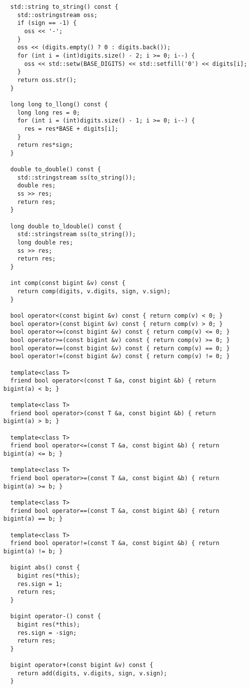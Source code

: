 \begin{lstlisting}
  std::string to_string() const {
    std::ostringstream oss;
    if (sign == -1) {
      oss << '-';
    }
    oss << (digits.empty() ? 0 : digits.back());
    for (int i = (int)digits.size() - 2; i >= 0; i--) {
      oss << std::setw(BASE_DIGITS) << std::setfill('0') << digits[i];
    }
    return oss.str();
  }

  long long to_llong() const {
    long long res = 0;
    for (int i = (int)digits.size() - 1; i >= 0; i--) {
      res = res*BASE + digits[i];
    }
    return res*sign;
  }

  double to_double() const {
    std::stringstream ss(to_string());
    double res;
    ss >> res;
    return res;
  }

  long double to_ldouble() const {
    std::stringstream ss(to_string());
    long double res;
    ss >> res;
    return res;
  }

  int comp(const bigint &v) const {
    return comp(digits, v.digits, sign, v.sign);
  }

  bool operator<(const bigint &v) const { return comp(v) < 0; }
  bool operator>(const bigint &v) const { return comp(v) > 0; }
  bool operator<=(const bigint &v) const { return comp(v) <= 0; }
  bool operator>=(const bigint &v) const { return comp(v) >= 0; }
  bool operator==(const bigint &v) const { return comp(v) == 0; }
  bool operator!=(const bigint &v) const { return comp(v) != 0; }

  template<class T>
  friend bool operator<(const T &a, const bigint &b) { return bigint(a) < b; }

  template<class T>
  friend bool operator>(const T &a, const bigint &b) { return bigint(a) > b; }

  template<class T>
  friend bool operator<=(const T &a, const bigint &b) { return bigint(a) <= b; }

  template<class T>
  friend bool operator>=(const T &a, const bigint &b) { return bigint(a) >= b; }

  template<class T>
  friend bool operator==(const T &a, const bigint &b) { return bigint(a) == b; }

  template<class T>
  friend bool operator!=(const T &a, const bigint &b) { return bigint(a) != b; }

  bigint abs() const {
    bigint res(*this);
    res.sign = 1;
    return res;
  }

  bigint operator-() const {
    bigint res(*this);
    res.sign = -sign;
    return res;
  }

  bigint operator+(const bigint &v) const {
    return add(digits, v.digits, sign, v.sign);
  }


\end{lstlisting}
